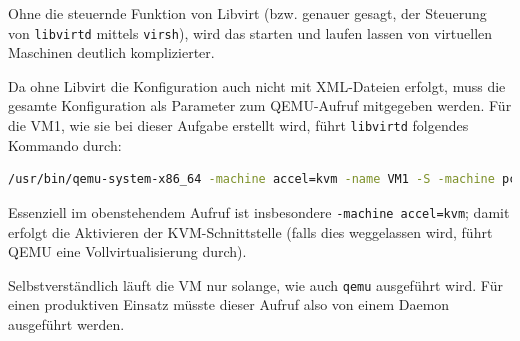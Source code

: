 Ohne die steuernde Funktion von Libvirt (bzw. genauer gesagt, der Steuerung von \lstinline|libvirtd| mittels \lstinline|virsh|), wird das starten und laufen lassen von virtuellen Maschinen deutlich komplizierter.

Da ohne Libvirt die Konfiguration auch nicht mit XML-Dateien erfolgt, muss die gesamte Konfiguration als Parameter zum QEMU-Aufruf mitgegeben werden. Für die VM1, wie sie bei dieser Aufgabe erstellt wird, führt \lstinline|libvirtd| folgendes Kommando durch:

\begin{lstlisting}[language=bash]
/usr/bin/qemu-system-x86_64 -machine accel=kvm -name VM1 -S -machine pc-i440fx-2.4,accel=kvm,usb=off -cpu SandyBridge,+osxsave,+pcid,+pdcm,+xtpr,+tm2,+est,+smx,+vmx,+ds_cpl,+monitor,+dtes64,+pbe,+tm,+ht,+ss,+acpi,+ds,+vme -m 512 -realtime mlock=off -smp 1,sockets=1,cores=1,threads=1 -uuid 1637255f-352a-474d-9964-071af0e8e15e -nographic -no-user-config -nodefaults -chardev socket,id=charmonitor,path=/var/lib/libvirt/qemu/VM1.monitor,server,nowait -mon chardev=charmonitor,id=monitor,mode=control -rtc base=utc,driftfix=slew -global kvm-pit.lost_tick_policy=discard -no-hpet -no-shutdown -global PIIX4_PM.disable_s3=1 -global PIIX4_PM.disable_s4=1 -boot strict=on -device ich9-usb-ehci1,id=usb,bus=pci.0,addr=0x4.0x7 -device ich9-usb-uhci1,masterbus=usb.0,firstport=0,bus=pci.0,multifunction=on,addr=0x4 -device ich9-usb-uhci2,masterbus=usb.0,firstport=2,bus=pci.0,addr=0x4.0x1 -device ich9-usb-uhci3,masterbus=usb.0,firstport=4,bus=pci.0,addr=0x4.0x2 -drive file=/var/lib/libvirt/images/vm1.qcow2,if=none,id=drive-virtio-disk0,format=qcow2 -device virtio-blk-pci,scsi=off,bus=pci.0,addr=0x3,drive=drive-virtio-disk0,id=virtio-disk0,bootindex=1 -netdev tap,fd=23,id=hostnet0,vhost=on,vhostfd=24 -device virtio-net-pci,netdev=hostnet0,id=net0,mac=52:54:00:9d:f7:54,bus=pci.0,addr=0x2 -netdev tap,fd=25,id=hostnet1,vhost=on,vhostfd=26 -device virtio-net-pci,netdev=hostnet1,id=net1,mac=52:54:00:09:17:8a,bus=pci.0,addr=0x6 -chardev pty,id=charserial0 -device isa-serial,chardev=charserial0,id=serial0 -device virtio-balloon-pci,id=balloon0,bus=pci.0,addr=0x5 -msg timestamp=on
\end{lstlisting}

Essenziell im obenstehendem Aufruf ist insbesondere \lstinline|-machine accel=kvm|; damit erfolgt die Aktivieren der KVM-Schnittstelle (falls dies weggelassen wird, führt QEMU eine Vollvirtualisierung durch).

Selbstverständlich läuft die VM nur solange, wie auch \lstinline|qemu| ausgeführt wird. Für einen produktiven Einsatz müsste dieser Aufruf also von einem Daemon ausgeführt werden.

